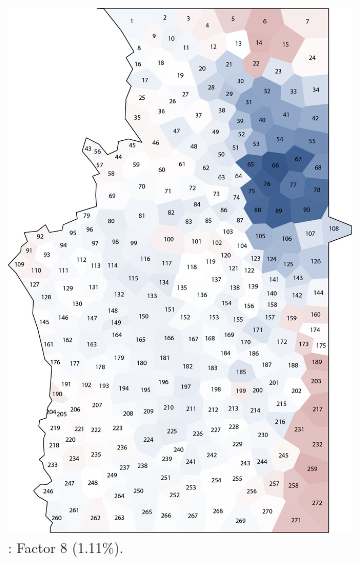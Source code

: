 \documentclass[output=paper]{LSP/langsci}
\begin{document}
\begin{figure}
\centering
\begin{subfigure}[t]{0.3\textwidth}
\includegraphics[width=\textwidth]{illustrations/pickl_fig12}
\caption{: Factor 8 (1.11\%).}
\label{fig:pickl:12}
\end{subfigure}   
~
\begin{subfigure}[t]{0.3\textwidth}

\end{subfigure}
\end{figure}
\end{document}
